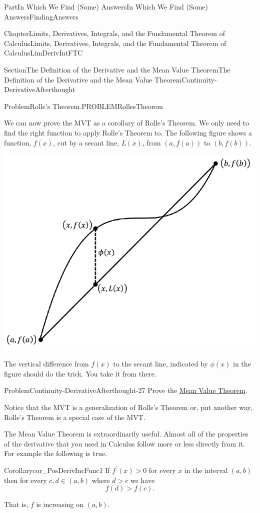 \documentclass[oneside,10pt,]{book}
\numberwithin{equation}{part}
\begin{document}
\begin{partptx}{Part}{In Which We Find (Some) Answers}{}{In Which We Find (Some) Answers}{}{}{FindingAnswers}
\begin{chapterptx}{Chapter}{Limits, Derivatives, Integrals, and the Fundamental Theorem of Calculus}{}{Limits, Derivatives, Integrals, and the Fundamental Theorem of Calculus}{}{}{LimDerivIntFTC}
\begin{sectionptx}{Section}{The Definition of  the Derivative and the Mean Value Theorem}{}{The Definition of  the Derivative and the Mean Value Theorem}{}{}{Continuity-DerivativeAfterthought}
\begin{problem}{Problem}{Rolle's Theorem.}{PROBLEMRollesTheorem}
\end{problem}
We can now prove the MVT as a corollary of Rolle's Theorem.  We only need to find the right function to apply Rolle's Theorem to.  The following figure shows a function, \(f(x)\), cut by a secant line, \(L(x)\), from \((a, f(a))\) to \((b,f(b))\).%
\begin{image}{0.3}{0.4}{0.3}{}%
\includegraphics[width=\linewidth]{external/images/MVT.png}
\end{image}%
The vertical difference from \(f(x)\) to the secant line, indicated by \(\phi(x)\) in the figure should do the trick.  You take it from there.%
\begin{problem}{Problem}{}{Continuity-DerivativeAfterthought-27}%
Prove the \hyperref[thm_MVT]{Mean Value Theorem}.%
\end{problem}
Notice that the MVT is a generalization of Rolle's Theorem or, put another way, Rolle's Theorem is a special case of the  MVT.%
\par
The Mean Value Theorem is extraordinarily useful.  Almost all of the properties of the derivative that you used in Calculus follow more or less directly from it.  For example the following is true.%
\begin{corollary}{Corollary}{}{}{cor_PosDerivIncFunc1}%
If \(f^\prime(x) > 0\) for every \(x\) in the interval \((a,b)\) then for every \(c,d\in(a,b)\) where \(d>c\) we have%
\begin{equation*}
f(d) > f(c) \text{.}
\end{equation*}
%
\par
That is, \(f\) is increasing on \((a,b)\).%

\end{corollary}
\end{sectionptx}
\end{chapterptx}
\end{partptx}
\end{document}
